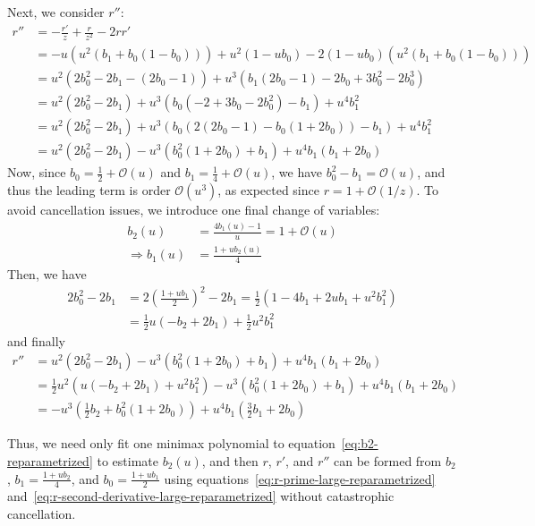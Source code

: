 \documentclass{article}
\begin{document}
Next, we consider $r''$:
%
\begin{align}
  r'' & = -\frac{r'}{z} + \frac{r}{z^2} - 2 r r'                                                \\
      & = -u(u^2 (b_1 + b_0(1-b_0))) + u^2 (1 - u b_0) - 2 (1 - u b_0) (u^2 (b_1 + b_0(1-b_0))) \\
      & = u^2 (2b_0^2 - 2b_1 - (2b_0 - 1)) + u^3 (b_1 (2b_0 - 1) - 2b_0 + 3b_0^2 - 2b_0^3)      \\
      & = u^2 (2b_0^2 - 2b_1) + u^3 (b_0 (- 2 + 3b_0 - 2b_0^2) - b_1) + u^4 b_1^2               \\
      & = u^2 (2b_0^2 - 2b_1) + u^3 (b_0 (2(2b_0 - 1) - b_0 (1 + 2b_0)) - b_1) + u^4 b_1^2      \\
      & = u^2 (2b_0^2 - 2b_1) - u^3 (b_0^2 (1 + 2b_0) + b_1) + u^4 b_1(b_1 + 2b_0)
\end{align}
%
Now, since $b_0 = \frac{1}{2} + \mathcal{O}(u)$ and $b_1 = \frac{1}{4} + \mathcal{O}(u)$, we have $b_0^2 - b_1 = \mathcal{O}(u)$, and thus the leading term is order $\mathcal{O}(u^3)$, as expected since $r = 1 + \mathcal{O}(1/z)$.
To avoid cancellation issues, we introduce one final change of variables:
%
\begin{align}
  b_2(u)             & = \frac{4 b_1(u) - 1}{u} = 1 + \mathcal{O}(u) \label{eq:b2-reparametrized} \\
  \Rightarrow b_1(u) & = \frac{1 + u b_2(u)}{4} \label{eq:b1-reparametrized}
\end{align}
%
Then, we have
%
\begin{align}
  2b_0^2 - 2b_1 & = 2(\frac{1 + u b_1}{2})^2 - 2b_1 = \frac{1}{2} (1 - 4 b_1 + 2 u b_1 + u^2 b_1^2) \\
                & = \frac{1}{2} u (-b_2 + 2 b_1) + \frac{1}{2} u^2 b_1^2
\end{align}
%
and finally
%
\begin{align}
  r'' & = u^2 (2b_0^2 - 2b_1) - u^3 (b_0^2 (1 + 2b_0) + b_1) + u^4 b_1(b_1 + 2b_0)                                                        \\
      & = \frac{1}{2} u^2 (u (-b_2 + 2 b_1) + u^2 b_1^2) - u^3 (b_0^2 (1 + 2b_0) + b_1) + u^4 b_1(b_1 + 2b_0)                             \\
      & = -u^3 (\frac{1}{2}b_2 + b_0^2 (1 + 2b_0)) + u^4 b_1 (\frac{3}{2} b_1 + 2b_0) \label{eq:r-second-derivative-large-reparametrized}
\end{align}

Thus, we need only fit one minimax polynomial to equation~\eqref{eq:b2-reparametrized} to estimate $b_2(u)$, and then $r$, $r'$, and $r''$ can be formed from $b_2$, $b_1 = \frac{1 + u b_2}{4}$, and $b_0 = \frac{1 + u b_1}{2}$ using equations~\eqref{eq:r-prime-large-reparametrized} and~\eqref{eq:r-second-derivative-large-reparametrized} without catastrophic cancellation.
\end{document}
